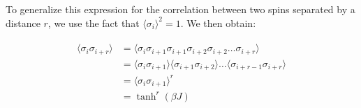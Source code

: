 To generalize this expression for the correlation between two spins separated by
a distance $r$, we use the fact that $\langle \sigma_i \rangle^2 = 1$. We then
obtain:

\begin{align}
  \begin{split}
    \langle \sigma_i \sigma_{i+r} \rangle &= \langle \sigma_i \sigma_{i+1} \sigma_{i+1} \sigma_{i+2} \sigma_{i+2} \dots \sigma_{i+r} \rangle \\
    &= \langle \sigma_i \sigma_{i+1} \rangle \langle \sigma_{i+1} \sigma_{i+2} \rangle \dots \langle \sigma_{i+r-1} \sigma_{i+r} \rangle \\
    &= \langle \sigma_i \sigma_{i+1} \rangle^r \\
    &= \tanh^r(\beta J)
  \end{split}
\end{align}